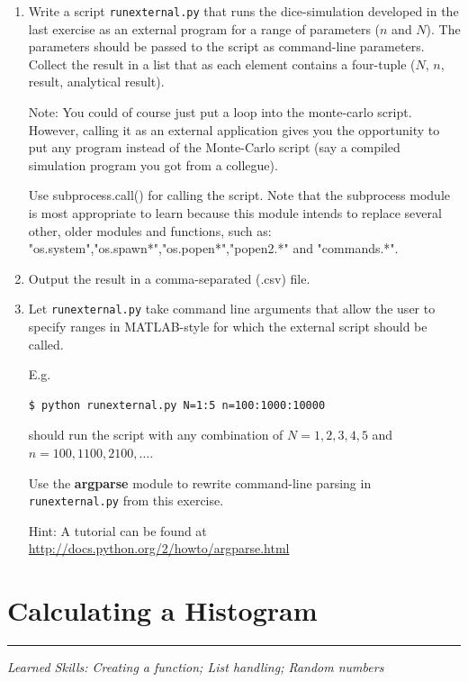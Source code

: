 \documentclass[smallheadings,12pt]{scrartcl}
\newcommand{\skills}[1]{\rule{1cm}{0pt}{\begin{minipage}{.8\textwidth}\small\em
      Learned Skills:  #1\end{minipage}}}
\begin{document}
\begin{enumerate}
\item Write a script \texttt{runexternal.py} that runs the
  dice-simulation developed in the last exercise as an external
  program for a range of parameters ($n$ and $N$). The parameters
  should be passed to the script as command-line parameters. Collect
  the result in a list that as each element contains a four-tuple
  ($N$, $n$, result, analytical result).

  Note: You could of course just put a loop into the monte-carlo
  script. However, calling it as an external application gives you the
  opportunity to put any program instead of the Monte-Carlo script
  (say a compiled simulation program you got from a collegue).
  
  Use subprocess.call() for calling the script. Note that the subprocess module is most appropriate to learn because this module intends to replace several other, older modules and functions, such as: "os.system","os.spawn*","os.popen*","popen2.*" and "commands.*".

\item Output the result in a comma-separated (.csv) file.
\item Let {\tt runexternal.py} take command line arguments that allow
  the user to specify ranges in MATLAB-style for which the external
  script should be called.

  E.g. 
\begin{verbatim}
$ python runexternal.py N=1:5 n=100:1000:10000 
\end{verbatim}
should run the script with any combination of $N=1,2,3,4,5$ and
$n=100,1100,2100,\ldots$. 

 Use the \textbf{argparse} module to rewrite command-line parsing in
 \texttt{runexternal.py} from this exercise.


Hint: A tutorial can be found at \url{http://docs.python.org/2/howto/argparse.html}

\end{enumerate}


\section{Calculating a Histogram}
\skills{Creating a function; List handling; Random numbers}
\end{document}
